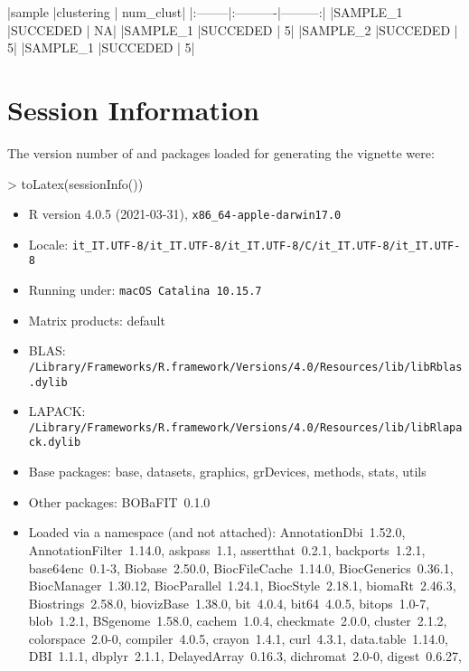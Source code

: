 \documentclass{article}
\begin{document}
\begin{Schunk}
\end{Schunk}
|sample   |clustering | num_clust|
|:--------|:----------|---------:|
|SAMPLE_1 |SUCCEDED   |        NA|
|SAMPLE_1 |SUCCEDED   |         5|
|SAMPLE_2 |SUCCEDED   |         5|
|SAMPLE_1 |SUCCEDED   |         5|
\newpage

\section{Session Information}

The version number of \R{} and packages loaded for generating the vignette were:
\begin{Schunk}
\begin{Sinput}
> toLatex(sessionInfo())
\end{Sinput}
\begin{itemize}\raggedright
  \item R version 4.0.5 (2021-03-31), \verb|x86_64-apple-darwin17.0|
  \item Locale: \verb|it_IT.UTF-8/it_IT.UTF-8/it_IT.UTF-8/C/it_IT.UTF-8/it_IT.UTF-8|
  \item Running under: \verb|macOS Catalina 10.15.7|
  \item Matrix products: default
  \item BLAS:   \verb|/Library/Frameworks/R.framework/Versions/4.0/Resources/lib/libRblas.dylib|
  \item LAPACK: \verb|/Library/Frameworks/R.framework/Versions/4.0/Resources/lib/libRlapack.dylib|
  \item Base packages: base, datasets, graphics, grDevices, methods,
    stats, utils
  \item Other packages: BOBaFIT~0.1.0
  \item Loaded via a namespace (and not attached):
    AnnotationDbi~1.52.0, AnnotationFilter~1.14.0, askpass~1.1,
    assertthat~0.2.1, backports~1.2.1, base64enc~0.1-3, Biobase~2.50.0,
    BiocFileCache~1.14.0, BiocGenerics~0.36.1, BiocManager~1.30.12,
    BiocParallel~1.24.1, BiocStyle~2.18.1, biomaRt~2.46.3,
    Biostrings~2.58.0, biovizBase~1.38.0, bit~4.0.4, bit64~4.0.5,
    bitops~1.0-7, blob~1.2.1, BSgenome~1.58.0, cachem~1.0.4,
    checkmate~2.0.0, cluster~2.1.2, colorspace~2.0-0, compiler~4.0.5,
    crayon~1.4.1, curl~4.3.1, data.table~1.14.0, DBI~1.1.1,
    dbplyr~2.1.1, DelayedArray~0.16.3, dichromat~2.0-0, digest~0.6.27,

\end{itemize}
\end{Schunk}
\end{document}
